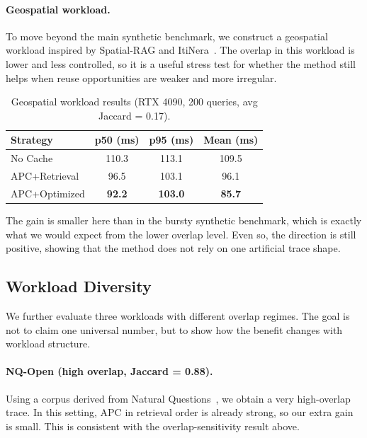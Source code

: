 \documentclass{article}
\begin{document}
\paragraph{Geospatial workload.}
\label{sec:spatial}

To move beyond the main synthetic benchmark, we construct a geospatial workload inspired by Spatial-RAG and ItiNera~\citep{yu2025spatialrag,tang2024itinera}. The overlap in this workload is lower and less controlled, so it is a useful stress test for whether the method still helps when reuse opportunities are weaker and more irregular.

\begin{table}[t]
\caption{Geospatial workload results (RTX 4090, 200 queries, avg Jaccard = 0.17).}
\label{tab:spatial}
\centering
\small
\begin{tabular}{@{}lccc@{}}
\toprule
\textbf{Strategy} & \textbf{p50 (ms)} & \textbf{p95 (ms)} & \textbf{Mean (ms)} \\
\midrule
No Cache      & 110.3 & 113.1 & 109.5 \\
APC+Retrieval & 96.5  & 103.1 & 96.1  \\
APC+Optimized & \textbf{92.2} & \textbf{103.0} & \textbf{85.7} \\
\bottomrule
\end{tabular}
\vspace{-0.5em}
\end{table}

The gain is smaller here than in the bursty synthetic benchmark, which is exactly what we would expect from the lower overlap level. Even so, the direction is still positive, showing that the method does not rely on one artificial trace shape.


\subsection{Workload Diversity}
\label{sec:nq}

We further evaluate three workloads with different overlap regimes. The goal is not to claim one universal number, but to show how the benefit changes with workload structure.

\paragraph{NQ-Open (high overlap, Jaccard = 0.88).}
\label{sec:nq_open}
Using a corpus derived from Natural Questions~\citep{kwiatkowski2019nq}, we obtain a very high-overlap trace. In this setting, APC in retrieval order is already strong, so our extra gain is small. This is consistent with the overlap-sensitivity result above.
\end{document}
